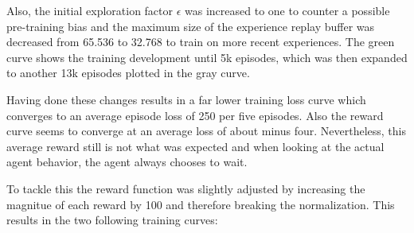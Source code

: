 Also, the initial exploration factor $\epsilon$ was increased to one to counter a possible pre-training bias and the maximum size of the experience replay buffer was decreased from 65.536 to 32.768 to train on more recent experiences. The green curve shows the training development until 5k episodes, which was then expanded to another 13k episodes plotted in the gray curve. 

Having done these changes results in a far lower training loss curve which converges to an average episode loss of 250 per five episodes. Also the reward curve seems to converge at an average loss of about minus four. Nevertheless, this average reward still is not what was expected and when looking at the actual agent behavior, the agent always chooses to wait. 

To tackle this the reward function was slightly adjusted by increasing the magnitue of each reward by 100 and therefore breaking the normalization. This results in the two following training curves:

